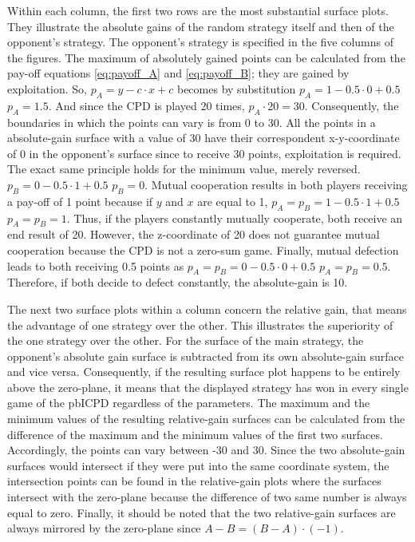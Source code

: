 \documentclass[11pt]{article}
\begin{document}
Within each column, the first two rows are the most substantial surface plots. 
They illustrate the absolute gains of the random strategy itself and then of the opponent’s strategy.
The opponent's strategy is specified in the five columns of the figures.
The maximum of absolutely gained points can be calculated from the pay-off equations \ref{eq:payoff_A} and \ref{eq:payoff_B}; they are gained by exploitation. 
So, $p_A = y - c \cdot x + c$ becomes by substitution $p_A = 1 - 0.5 \cdot 0 + 0.5$ \textrightarrow $p_A = 1.5$.
And since the CPD is played 20 times, $p_A \cdot 20 = 30$.
Consequently, the boundaries in which the points can vary is from 0 to 30. 
All the points in a absolute-gain surface with a value of 30 have their correspondent x-y-coordinate of 0 in the opponent’s surface since to receive 30 points, exploitation is required. 
The exact same principle holds for the minimum value, merely reversed.
$p_B = 0 - 0.5 \cdot 1 + 0.5$ \textrightarrow $p_B = 0$.
Mutual cooperation results in both players receiving a pay-off of 1 point because if $y$ and $x$ are equal to 1, $p_A = p_B = 1 - 0.5 \cdot 1 + 0.5$ \textrightarrow $p_A = p_B = 1$.
Thus, if the players constantly mutually cooperate, both receive an end result of 20.
However, the z-coordinate of 20 does not guarantee mutual cooperation because the CPD is not a zero-sum game.
Finally, mutual defection leads to both receiving 0.5 points as $p_A = p_B = 0 - 0.5 \cdot 0 + 0.5$ \textrightarrow $p_A = p_B = 0.5$.
Therefore, if both decide to defect constantly, the absolute-gain is 10.

The next two surface plots within a column concern the relative gain, that means the advantage of one strategy over the other. 
This illustrates the superiority of the one strategy over the other. 
For the surface of the main strategy, the opponent’s absolute gain surface is subtracted from its own absolute-gain surface and vice versa. 
Consequently, if the resulting surface plot happens to be entirely above the zero-plane, it means that the displayed strategy has won in every single game of the pbICPD regardless of the parameters.
The maximum and the minimum values of the resulting relative-gain surfaces can be calculated from the difference of the maximum and the minimum values of the first two surfaces. 
Accordingly, the points can vary between -30 and 30. 
Since the two absolute-gain surfaces would intersect if they were put into the same coordinate system, the intersection points can be found in the relative-gain plots where the surfaces intersect with the zero-plane because the difference of two same number is always equal to zero. 
Finally, it should be noted that the two relative-gain surfaces are always mirrored by the zero-plane since $A - B = (B - A) \cdot (-1)$.
\end{document}
